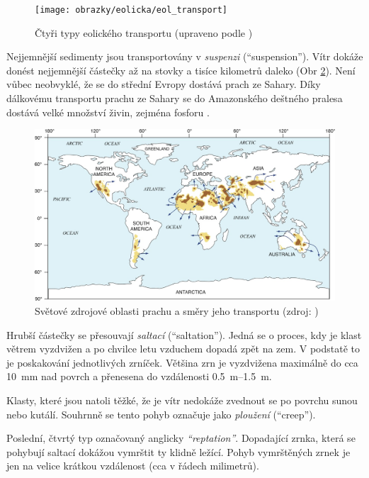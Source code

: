 \begin{figure}
	\centering
	\texttt{[image: obrazky/eolicka/eol\_transport]}
	\caption{Čtyři typy eolického transportu (upraveno podle \textcite{livingstoneAeolianGeomorphologyNew2019})}
	\label{fig:eoltransport}
\end{figure}


Nejjemnější sedimenty jsou transportovány v \emph{suspenzi} (\enquote{suspension}). Vítr dokáže donést nejjemnější částečky až na stovky a tisíce kilometrů daleko (Obr \ref{fig:zdrojprachu}). Není vůbec neobvyklé, že se do střední Evropy dostává prach ze Sahary. Díky dálkovému transportu prachu ze Sahary se do Amazonského deštného pralesa dostává velké množství živin, zejména fosforu \parencite{prosperoCharacterizingQuantifyingAfrican2020}.

\begin{figure}
	\centering
	\includegraphics[width=1\linewidth]{obrazky/eolicka/zdroje_prachu}
	\caption{Světové zdrojové oblasti prachu a směry jeho transportu (zdroj: \textcite{muhsIdentifyingSourcesAeolian2014})}
	\label{fig:zdrojprachu}
\end{figure}

Hrubší částečky se přesouvají \emph{saltací} (\enquote{saltation}). Jedná se o proces, kdy je klast větrem vyzdvižen a po chvilce letu vzduchem dopadá zpět na zem. V podstatě to je poskakování jednotlivých zrníček. Většina zrn je vyzdvižena maximálně do cca \SI{10}{\milli\metre} nad povrch a přenesena do vzdálenosti \SIrange{0,5}{1,5}{\metre}.

Klasty, které jsou natoli těžké, že je vítr nedokáže zvednout se po povrchu sunou nebo kutálí. Souhrnně se tento pohyb označuje jako \emph{ploužení} (\enquote{creep}).

Poslední, čtvrtý typ označovaný anglicky \emph{\enquote{reptation}}. Dopadající zrnka, která se pohybují saltací dokážou vymrštit ty klidně ležící. Pohyb vymrštěných zrnek je jen na velice krátkou vzdálenost (cca v řádech milimetrů).


